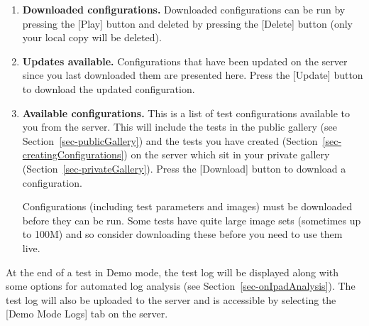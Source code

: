 \documentclass{article}
\begin{document}
\begin{enumerate}

\item {\bf Downloaded configurations.}
Downloaded configurations can be run by pressing the [Play] button and
deleted by pressing the [Delete] button (only your local copy will be
deleted).


\item {\bf Updates available.} Configurations that have been updated on
the server since you last downloaded them are presented here.
Press the [Update] button to download the updated configuration.

\item {\bf Available configurations.}
This is a list of test configurations available to you from the server.
This will include the tests in the public gallery (see
Section~\ref{sec-publicGallery}) and the tests you have created 
(Section~\ref{sec-creatingConfigurations})
on the server which sit in your private gallery 
(Section~\ref{sec-privateGallery}).
Press the [Download] button to download a configuration.

Configurations (including test parameters and images) must be
downloaded before they can be run.
Some tests have quite large image sets (sometimes up to 100M) and
so consider downloading these before you need to use them live.
\end{enumerate}

At the end of a test in Demo mode, the test log will be displayed along
with some options for automated log analysis (see
Section~\ref{sec-onIpadAnalysis}).
The test log will also be uploaded to the server and is accessible by
selecting the [Demo Mode Logs] tab on the server.
\end{document}
